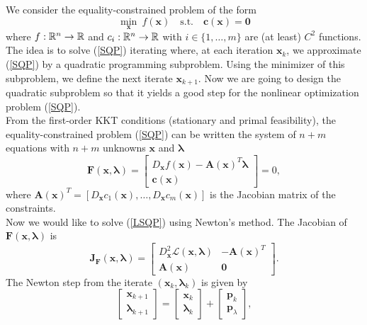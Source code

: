 We consider the equality-constrained problem of the form
\begin{equation}
\min_{\bm{x}}\ f(\bm{x})\quad\text{s.t.}\quad \bm{c}(\bm{x})=\bm{0}
\label{SQP}
\end{equation}
where $f:\mathbb{R}^n\to\mathbb{R}$ and $c_i:\mathbb{R}^n\to\mathbb{R}$ with $i\in\{1,\dots,m\}$ are (at least) $C^2$ functions. The idea is to solve (\ref{SQP}) iterating where, at each iteration $\bm{x}_k$, we approximate (\ref{SQP}) by a quadratic programming subproblem. Using the minimizer of this subproblem, we define the next iterate $\bm{x}_{k+1}$. Now we are going to design the quadratic subproblem so that it yields a good step for the nonlinear optimization problem (\ref{SQP}).\\
From the first-order KKT conditions (stationary and primal feasibility), the equality-constrained problem (\ref{SQP}) can be written the system of $n+m$ equations with $n+m$ unknowns $\bm{x}$ and $\bm{\lambda}$
\begin{equation}
\bm{F}(\bm{x},\bm{\lambda})=\begin{bmatrix}
D_{\bm{x}} f(\bm{x})-\bm{A}(\bm{x})^T\bm{\lambda}\\
\bm{c}(\bm{x})
\end{bmatrix}=0,
\label{LSQP}
\end{equation}
where $\bm{A}(\bm{x})^T=\left[D_{\bm{x}} c_1(\bm{x}),\dots,D_{\bm{x}} c_m(\bm{x})\right]$ is the Jacobian matrix of the constraints.\\
Now we would like to solve (\ref{LSQP}) using Newton's method. The Jacobian of $\bm{F}(\bm{x},\bm{\lambda})$ is
\begin{equation}
\bm{J}_{\bm{F}}(\bm{x},\bm{\lambda})=\begin{bmatrix}
D_{\bm{x}}^2\mathcal{L}(\bm{x},\bm{\lambda}) & -\bm{A}(\bm{x})^T \\
\bm{A}(\bm{x}) & \bm{0}
\end{bmatrix}.
\end{equation}
The Newton step from the iterate $(\bm{x}_k,\bm{\lambda}_k)$ is given by
\begin{equation}
\begin{bmatrix}
\bm{x}_{k+1}\\
\bm{\lambda}_{k+1}
\end{bmatrix}=\begin{bmatrix}
\bm{x}_{k}\\
\bm{\lambda}_{k}
\end{bmatrix}+\begin{bmatrix}
\bm{p}_{k}\\
\bm{p}_{\lambda}
\end{bmatrix},
\end{equation}
